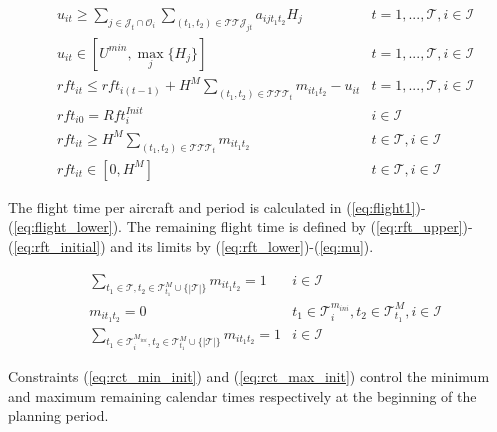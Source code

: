 \documentclass[a4paper,onecolumn,fleqn]{article}
\begin{document}
    \begin{align}
         & u_{it} \geq \sum_{j \in \mathcal{J}_t \cap \mathcal{O}_i} \sum_{(t_1, t_2) \in \mathcal{T}\mathcal{T}\mathcal{J}_{jt}} a_{ijt_1t_2} H_j 
            & t =1, ..., \mathcal{T}, i \in \mathcal{I} \label{eq:flight1}\\
         & u_{it} \in [U^{min}, \max_j{\{H_j\}}]
            & t =1, ..., \mathcal{T}, i \in \mathcal{I} \label{eq:flight_lower}\\
         & rft_{it} \leq rft_{i(t-1)} + H^M \sum_{(t_1, t_2) \in \mathcal{T}\mathcal{T}\mathcal{T}_{t}} m_{it_1t_2} - u_{it}
            & t =1, ..., \mathcal{T}, i \in \mathcal{I} \label{eq:rft_upper}\\
        & rft_{i0} = Rft^{Init}_i
               & i \in \mathcal{I} \label{eq:rft_initial}\\
        & rft_{it} \geq H^M \sum_{(t_1, t_2) \in \mathcal{T}\mathcal{T}\mathcal{T}_{t}} m_{it_1t_2}
                &t \in \mathcal{T}, i \in \mathcal{I}\label{eq:rft_lower}\\
        & rft_{it} \in [0,H^M]
                & t \in \mathcal{T}, i \in \mathcal{I} \label{eq:mu}
    \end{align}

    The flight time per aircraft and period is calculated in (\ref{eq:flight1})-(\ref{eq:flight_lower}). The remaining flight time is defined by (\ref{eq:rft_upper})-(\ref{eq:rft_initial}) and its limits by (\ref{eq:rft_lower})-(\ref{eq:mu}).

    \begin{align}
        & \sum_{t_1 \in \mathcal{T}, t_2 \in \mathcal{T}^M_{t_1} \cup \{|\mathcal{T}|\} } m_{it_1t_2} =  1 
          & i \in \mathcal{I}\label{eq:num_maint} \\
        & m_{it_1t_2} = 0
          & t_1 \in \mathcal{T}^{m_{ini}}_i, t_2 \in \mathcal{T}^M_{t_1}, i \in \mathcal{I}\label{eq:rct_min_init} \\
        & \sum_{t_1 \in \mathcal{T}^{M_{ini}}_i, t_2 \in \mathcal{T}^M_{t_1} \cup \{|\mathcal{T}|\} } m_{it_1t_2} =  1 
          & i \in \mathcal{I}\label{eq:rct_max_init}
    \end{align}

    Constraints (\ref{eq:rct_min_init}) and (\ref{eq:rct_max_init}) control the minimum and maximum remaining calendar times respectively at the beginning of the planning period. 
\end{document}
